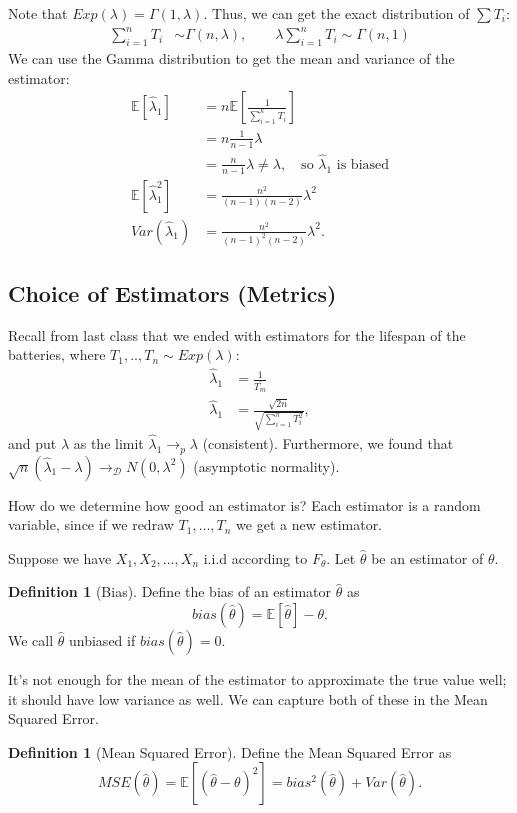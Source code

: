 \documentclass{tufte-handout}
\newcommand*\E{\mathbb{E}}
\theoremstyle{definition}
\newtheorem{defn}[thm]{Definition}
\begin{document}
Note that $Exp(\lambda) =  \Gamma(1,\lambda)$. Thus, we can get the exact distribution of $\sum T_i$:
\begin{align*}
	\sum\limits_{i=1}^{n} T_i &\sim \Gamma(n,\lambda), \qquad \lambda \sum\limits_{i=1}^{n} T_i \sim  \Gamma(n,1)
\end{align*}
We can use the Gamma distribution to get the mean and variance of the estimator:
\begin{align*}
	\E\left[\hat{\lambda}_1\right] &= n \E\left[\frac{1}{\sum\limits_{i=1}^{k} T_i}\right]  \\
	&= n \frac{1}{n-1} \lambda \\
	&= \frac{n}{n-1}\lambda \ne \lambda, \quad \text{so $\hat{\lambda}_1$ is biased} \\
	\E\left[\hat{\lambda}_1^2\right] &= \frac{n^2}{(n-1)(n-2)}\lambda^2 \\
	Var(\hat{\lambda}_1) &= \frac{n^2}{\left( n-1 \right)^2\left( n-2 \right)}\lambda^2
.\end{align*}

\subsection{Choice of Estimators (Metrics)}

Recall from last class that we ended with estimators for the lifespan of the batteries, where $T_1,..,T_n \sim Exp(\lambda)$:
\begin{align*}
	\hat{\lambda}_1 &=  \frac{1}{\overline{T_m}} \\
	\hat{\lambda}_1 &= \frac{\sqrt{2n} }{\sqrt{\sum\limits_{i=1}^{n} T_i^2} }
,\end{align*}
and put $\lambda$ as the limit $\hat{\lambda}_1 \to_{p} \lambda$ (consistent). Furthermore, we found that $\sqrt{n} \left( \hat{\lambda}_1 - \lambda \right) \to_{\mathscr{D}} N(0,\lambda^2)$ (asymptotic normality).

How do we determine how good an estimator is? Each estimator is a random variable, since if we redraw $T_1,\ldots,T_n$ we get a new estimator. 

Suppose we have $X_1,X_2,\ldots,X_n$ i.i.d according to $F_{\theta}$. Let $\hat{\theta}$ be an estimator of $\theta$.
\begin{defn}[Bias]
	Define the bias of an estimator $\hat{\theta}$ as \[
		bias(\hat{\theta}) = \E\left[\hat{\theta}\right] -\theta
	.\] 
	We call $\hat{\theta}$ unbiased if $bias(\hat{\theta}) = 0$.
\end{defn}
It's not enough for the mean of the estimator to approximate the true value well; it should have low variance as well. We can capture both of these in the Mean Squared Error.
\begin{defn}[Mean Squared Error]
	Define the Mean Squared Error as \[
		MSE(\hat{\theta}) = \E\left[\left( \hat{\theta} - \theta \right)^2\right] = bias^2(\hat{\theta}) + Var(\hat{\theta})
	.\] 
\end{defn}
\end{document}
